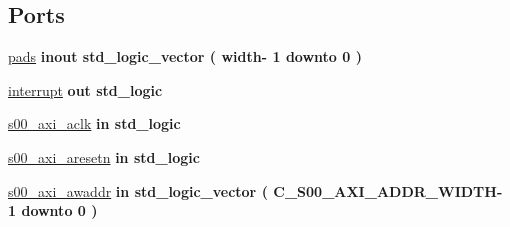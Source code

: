 \subsection*{Ports}
 \begin{DoxyCompactItemize}
\item 
\mbox{\label{classGPIO__v1__0_ac0744a550c27f11ab186fd7a1156a54e}} 
\hyperlink{classGPIO__v1__0_ac0744a550c27f11ab186fd7a1156a54e}{pads}  {\bfseries {\bfseries \textcolor{vhdlchar}{inout}\textcolor{vhdlchar}{ }}} {\bfseries \textcolor{vhdlchar}{std\+\_\+logic\+\_\+vector}\textcolor{vhdlchar}{ }\textcolor{vhdlchar}{(}\textcolor{vhdlchar}{ }\textcolor{vhdlchar}{ }\textcolor{vhdlchar}{ }\textcolor{vhdlchar}{ }\textcolor{vhdlchar}{width}\textcolor{vhdlchar}{-\/}\textcolor{vhdlchar}{ } \textcolor{vhdldigit}{1} \textcolor{vhdlchar}{ }\textcolor{vhdlchar}{downto}\textcolor{vhdlchar}{ }\textcolor{vhdlchar}{ } \textcolor{vhdldigit}{0} \textcolor{vhdlchar}{ }\textcolor{vhdlchar}{)}\textcolor{vhdlchar}{ }} 
\item 
\mbox{\label{classGPIO__v1__0_a5b78f3e3edfaf6e8ec79031b9e631e9d}} 
\hyperlink{classGPIO__v1__0_a5b78f3e3edfaf6e8ec79031b9e631e9d}{interrupt}  {\bfseries {\bfseries \textcolor{vhdlchar}{out}\textcolor{vhdlchar}{ }}} {\bfseries \textcolor{vhdlchar}{std\+\_\+logic}\textcolor{vhdlchar}{ }} 
\item 
\mbox{\label{classGPIO__v1__0_a037f9e3df8559bfd59db37bcba9cb7a8}} 
\hyperlink{classGPIO__v1__0_a037f9e3df8559bfd59db37bcba9cb7a8}{s00\+\_\+axi\+\_\+aclk}  {\bfseries {\bfseries \textcolor{vhdlchar}{in}\textcolor{vhdlchar}{ }}} {\bfseries \textcolor{vhdlchar}{std\+\_\+logic}\textcolor{vhdlchar}{ }} 
\item 
\mbox{\label{classGPIO__v1__0_a8249c106fbd80196dcad2666c9f0b3fc}} 
\hyperlink{classGPIO__v1__0_a8249c106fbd80196dcad2666c9f0b3fc}{s00\+\_\+axi\+\_\+aresetn}  {\bfseries {\bfseries \textcolor{vhdlchar}{in}\textcolor{vhdlchar}{ }}} {\bfseries \textcolor{vhdlchar}{std\+\_\+logic}\textcolor{vhdlchar}{ }} 
\item 
\mbox{\label{classGPIO__v1__0_a9fe80d3cc7f862afb670536e4e05dbeb}} 
\hyperlink{classGPIO__v1__0_a9fe80d3cc7f862afb670536e4e05dbeb}{s00\+\_\+axi\+\_\+awaddr}  {\bfseries {\bfseries \textcolor{vhdlchar}{in}\textcolor{vhdlchar}{ }}} {\bfseries \textcolor{vhdlchar}{std\+\_\+logic\+\_\+vector}\textcolor{vhdlchar}{ }\textcolor{vhdlchar}{(}\textcolor{vhdlchar}{ }\textcolor{vhdlchar}{ }\textcolor{vhdlchar}{ }\textcolor{vhdlchar}{ }\textcolor{vhdlchar}{C\+\_\+\+S00\+\_\+\+A\+X\+I\+\_\+\+A\+D\+D\+R\+\_\+\+W\+I\+D\+TH}\textcolor{vhdlchar}{-\/}\textcolor{vhdlchar}{ } \textcolor{vhdldigit}{1} \textcolor{vhdlchar}{ }\textcolor{vhdlchar}{downto}\textcolor{vhdlchar}{ }\textcolor{vhdlchar}{ } \textcolor{vhdldigit}{0} \textcolor{vhdlchar}{ }\textcolor{vhdlchar}{)}\textcolor{vhdlchar}{ }} 

\end{DoxyCompactItemize}

